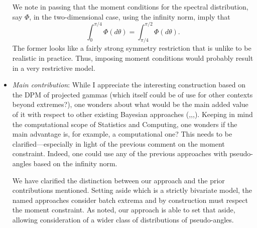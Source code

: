 \documentclass[10pt]{article}
\newcommand{\comment}[1]{\textcolor{teal}{#1}}
\newcommand{\bruno}[1]{\textcolor{red}{#1}}
\begin{document}
\begin{itemize}
We note in passing that the moment conditions for the spectral distribution, say 
    $\Phi$, in the two-dimensional case, using the infinity norm, imply that 
    \[
        \int_0^{\pi/4} \Phi(d\theta) = \int_{\pi/4}^{\pi/2}
    \Phi(d\theta).
    \]
    The former looks like a fairly strong symmetry restriction that is unlike to 
    be realistic in practice. Thus, imposing moment conditions would probably 
    result in a very restrictive model.


\item \emph{Main contribution}: While I appreciate the interesting construction 
    based on the DPM of projected gammas (which itself could be of use for other 
    contexts beyond extremes?), one wonders about what would be the main added 
    value of it with respect to other existing Bayesian approaches 
    (\cite{boldi2007},\cite{guillotte2011},\cite{SaNa2014},\cite{hanson2017}).
    Keeping in mind the computational scope of Statistics and Computing, one 
    wonders if the main advantage is, for example, a computational one? This 
    needs to be clarified—especially in light of the previous comment on the 
    moment constraint. Indeed, one could use any of the previous approaches with 
    pseudo-angles based on the infinity norm.

We have clarified the distinction between our approach and the prior contributions
    mentioned.  Setting aside \cite{guillotte2011} which is a strictly bivariate
    model, the named approaches consider batch extrema and by construction must
    respect the moment constraint.  As noted, our approach is able to set that 
    aside, allowing consideration of a wider class of distributions of pseudo-angles.

    


\end{itemize}
\end{document}
